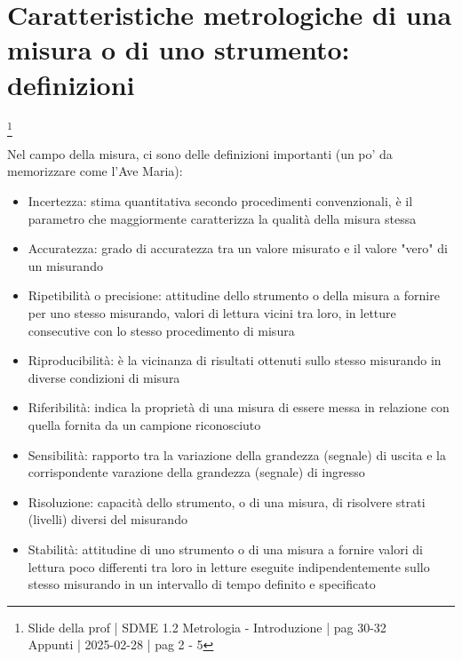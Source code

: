 \newpage  

\section{Caratteristiche metrologiche di una misura o di uno strumento: definizioni} 
\footnote{Slide della prof | SDME 1.2 Metrologia - Introduzione | pag 30-32 \\  
Appunti | 2025-02-28 | pag 2 - 5}

Nel campo della misura, ci sono delle definizioni importanti (un po' da memorizzare come l'Ave Maria): 

\begin{itemize}
    \item Incertezza: stima quantitativa secondo procedimenti convenzionali, è il parametro che maggiormente caratterizza la qualità della misura stessa 
    \item Accuratezza: grado di accuratezza tra un valore misurato e il valore "vero" di un misurando 
    \item Ripetibilità o precisione: attitudine dello strumento o della misura a fornire per uno stesso misurando, valori di lettura vicini tra loro, in letture consecutive con lo stesso procedimento di misura 
    \item Riproducibilità: è la vicinanza di risultati ottenuti sullo stesso misurando in diverse condizioni di misura 
    \item Riferibilità: indica la proprietà di una misura di essere messa in relazione con quella fornita da un campione riconosciuto 
    \item Sensibilità: rapporto tra la variazione della grandezza (segnale) di uscita e la corrispondente varazione della grandezza (segnale) di ingresso 
    \item Risoluzione: capacità dello strumento, o di una misura, di risolvere strati (livelli) diversi del misurando 
    \item Stabilità: attitudine di uno strumento o di una misura a fornire valori di lettura poco differenti tra loro in letture eseguite indipendentemente sullo stesso misurando in un intervallo di tempo definito e specificato
\end{itemize}

\newpage